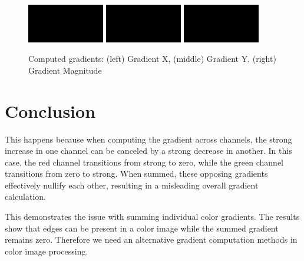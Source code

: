 \begin{figure}[h]
    \centering
    \includegraphics[width=0.3\textwidth]{../Images/gradient_x.png}
    \includegraphics[width=0.3\textwidth]{../Images/gradient_y.png}
    \includegraphics[width=0.3\textwidth]{../Images/gradient_magnitude.png}
    \caption{Computed gradients: (left) Gradient X, (middle) Gradient Y, (right) Gradient Magnitude}
    \label{fig:results}
\end{figure}

\section*{Conclusion}
This happens because when computing the gradient across channels, the strong increase in one channel can be canceled by a strong decrease in another. In this case, the red channel transitions from strong to zero, while the green channel transitions from zero to strong. When summed, these opposing gradients effectively nullify each other, resulting in a misleading overall gradient calculation.

This demonstrates the issue with summing individual color gradients. The results show that edges can be present in a color image while the summed gradient remains zero. Therefore we need an alternative gradient computation methods in color image processing.